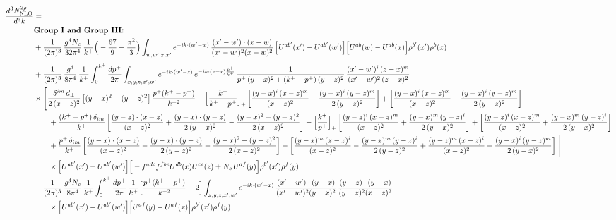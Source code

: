 \documentclass[10pt]{article}
\numberwithin{equation}{section}
\begin{document}
\begin{align}
\frac{d^{3}N^{2\rho}_{\rm NLO}}{d^{3}k}&=\notag\\
&\textbf{Group I and Group III:}\notag\\
&+\frac{1}{(2\pi)^{3}}\,\frac{g^{4}N_{c}}{32\pi^{4}}\,\frac{1}{k^{+}}\Big(-\frac{67}{9}+\frac{\pi^{2}}{3}\Big)\int_{w,w^{\prime},x,x^{\prime}}e^{-ik\cdot (w^{\prime}-w)}\,\frac{(x^{\prime}-w^{\prime})\cdot(x-w)}{(x^{\prime}-w^{\prime})^{2}(x-w)^{2}}\,\Big[U^{ab^{\prime}}(x^{\prime})-U^{ab^{\prime}}(w^{\prime})\Big]\Big[U^{ab}(w)-U^{ab}(x)\Big]\rho^{b^{\prime}}(x^{\prime})\rho^{b}(x)\notag\\[4pt]
&+\frac{1}{(2\pi)^{3}}\,\frac{g^{4}}{8\pi^{4}}\,\frac{1}{k^{+}}\int_{0}^{k^{+}}\frac{dp^{+}}{2\pi}\int_{x,y,z,x^{\prime},w^{\prime}}e^{-ik\cdot (w^{\prime}-z)}\,e^{-ik\cdot (z-x)\frac{p^{+}}{k^{+}}}\,\frac{1}{p^{+}\,(y-x)^{2}+(k^{+}-p^{+})\,(y-z)^{2}}\,\frac{(x^{\prime}-w^{\prime})^{i}\,(z-x)^{m}}{(x^{\prime}-w^{\prime})^{2}\,(z-x)^{2}}\notag\\
&\times\Bigg[\frac{\delta^{im}\,d_{\perp}}{2\,(x-z)^{2}}\left[(y-x)^{2}-(y-z)^{2}\right]\frac{p^{+}(k^{+}-p^{+})}{k^{+2}}
-\Big[\frac{k^{+}}{k^{+}-p^{+}}\Big]_{+}\left[\frac{(y-x)^{i}\,(x-z)^{m}}{(x-z)^{2}}-\frac{(y-x)^{i}\,(y-z)^{m}}{2\,(y-z)^{2}}\right]
+\left[\frac{(y-x)^{i}\,(x-z)^{m}}{(x-z)^{2}}-\frac{(y-x)^{i}\,(y-z)^{m}}{2\,(y-z)^{2}}\right]\notag\\
&\qquad+\frac{(k^{+}-p^{+})\,\delta_{im}}{k^{+}}\left[\frac{(y-z)\cdot(x-z)}{(x-z)^{2}}+\frac{(y-x)\cdot(y-z)}{2\,(y-x)^{2}}-\frac{(y-x)^{2}-(y-z)^{2}}{2\,(x-z)^{2}}\right]
-\Big[\frac{k^{+}}{p^{+}}\Big]_{+}\left[\frac{(y-z)^{i}\,(x-z)^{m}}{(x-z)^{2}}+\frac{(y-x)^{m}\,(y-z)^{i}}{2\,(y-x)^{2}}\right]+\left[\frac{(y-z)^{i}\,(x-z)^{m}}{(x-z)^{2}}+\frac{(y-x)^{m}\,(y-z)^{i}}{2\,(y-x)^{2}}\right]\notag\\
&\qquad+\frac{p^{+}\,\delta_{im}}{k^{+}}\left[\frac{(y-x)\cdot(x-z)}{(x-z)^{2}}-\frac{(y-x)\cdot(y-z)}{2\,(y-z)^{2}}-\frac{(y-x)^{2}-(y-z)^{2}}{2\,(x-z)^{2}}\right]
-\left[\frac{(y-x)^{m}\,(x-z)^{i}}{(x-z)^{2}}-\frac{(y-x)^{m}\,(y-z)^{i}}{2\,(y-z)^{2}}+\frac{(y-z)^{m}\,(x-z)^{i}}{(x-z)^{2}}+\frac{(y-x)^{i}\,(y-z)^{m}}{2\,(y-x)^{2}}\right]\Bigg]\notag\\
&\qquad\times\Big[U^{ab^{\prime}}(x^{\prime})-U^{ab^{\prime}}(w^{\prime})\Big]\Big[-f^{adc}f^{fbe}U^{db}(x)U^{ce}(z)+N_{c}\,U^{af}(y)\Big]\rho^{b^{\prime}}(x^{\prime})\rho^{f}(y)\notag\\
&-\frac{1}{(2\pi)^{3}}\,\frac{g^{4}N_{c}}{8\pi^{4}}\,\frac{1}{k^{+}}\int_{0}^{k^{+}}\frac{dp^{+}}{2\pi}\,\frac{1}{k^{+}}\Big[\frac{p^{+}(k^{+}-p^{+})}{k^{+2}}-2\Big]\int_{x,y,z,x^{\prime},w^{\prime}}e^{-ik\cdot (w^{\prime}-x)}\,\frac{(x^{\prime}-w^{\prime})\cdot(y-x)}{(x^{\prime}-w^{\prime})^{2}(y-x)^{2}}\,\frac{(y-z)\cdot(y-x)}{(y-z)^{2}(x-z)^{2}}\notag\\&\qquad\times\Big[U^{ab^{\prime}}(x^{\prime})-U^{ab^{\prime}}(w^{\prime})\Big]\Big[U^{af}(y)-U^{af}(x)\Big]\rho^{b^{\prime}}(x^{\prime})\rho^{f}(y)\notag\\[4pt]

\end{align}
\end{document}
